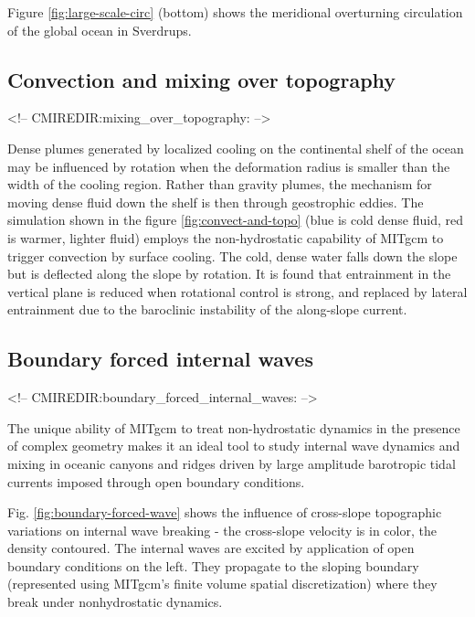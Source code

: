 Figure \ref{fig:large-scale-circ} (bottom) shows the meridional overturning 
circulation of the global ocean in Sverdrups.



\subsection{Convection and mixing over topography}
\begin{rawhtml}
<!-- CMIREDIR:mixing_over_topography: -->
\end{rawhtml}


Dense plumes generated by localized cooling on the continental shelf of the
ocean may be influenced by rotation when the deformation radius is smaller
than the width of the cooling region. Rather than gravity plumes, the
mechanism for moving dense fluid down the shelf is then through geostrophic
eddies. The simulation shown in the figure \ref{fig:convect-and-topo}
(blue is cold dense fluid, red is
warmer, lighter fluid) employs the non-hydrostatic capability of MITgcm to
trigger convection by surface cooling. The cold, dense water falls down the
slope but is deflected along the slope by rotation. It is found that
entrainment in the vertical plane is reduced when rotational control is
strong, and replaced by lateral entrainment due to the baroclinic
instability of the along-slope current.



\subsection{Boundary forced internal waves}
\begin{rawhtml}
<!-- CMIREDIR:boundary_forced_internal_waves: -->
\end{rawhtml}

The unique ability of MITgcm to treat non-hydrostatic dynamics in the
presence of complex geometry makes it an ideal tool to study internal wave
dynamics and mixing in oceanic canyons and ridges driven by large amplitude
barotropic tidal currents imposed through open boundary conditions.

Fig. \ref{fig:boundary-forced-wave} shows the influence of cross-slope 
topographic variations on
internal wave breaking - the cross-slope velocity is in color, the density
contoured. The internal waves are excited by application of open boundary
conditions on the left. They propagate to the sloping boundary (represented
using MITgcm's finite volume spatial discretization) where they break under
nonhydrostatic dynamics.


